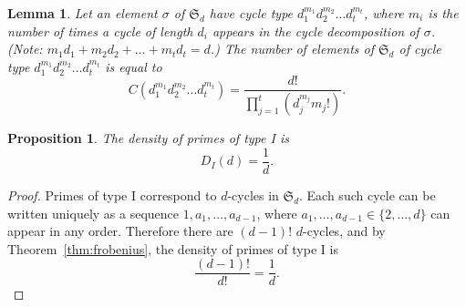 \documentclass[11pt]{article}
\theoremstyle{plain}
\newtheorem{lemma}[theorem]{Lemma}
\newtheorem{proposition}[theorem]{Proposition}
\theoremstyle{definition}
\theoremstyle{remark}
\numberwithin{equation}{section}
\renewcommand{\SS}{\mathfrak{S}}
\begin{document}
\begin{lemma}\label{lem:cycletype}
  Let an element $\sigma$ of $\SS_d$ have cycle type $d_1^{m_1}d_2^{m_2}\ldots d_t^{m_t}$, 
  where $m_i$ is the number of times a cycle of length $d_i$ appears in the cycle
  decomposition of $\sigma$. (Note: $m_1d_1+m_2d_2+\ldots +m_td_t=d$.) The number
   of elements of $\SS_d$ of cycle type $d_1^{m_1}d_2^{m_2}\ldots d_t^{m_t}$ is equal to
  \begin{equation*}
    C(d_1^{m_1}d_2^{m_2}\ldots d_t^{m_t})=\frac{d!}{\prod_{j=1}^t\left(d_j^{m_j}m_j!\right)}.
  \end{equation*}
\end{lemma}


\begin{proposition}\label{prop:type1}
  The density of primes of type I is 
  \begin{equation*}
    D_I(d)=\frac{1}{d}.
  \end{equation*}
\end{proposition}
\begin{proof}
  Primes of type I correspond to $d$-cycles in $\SS_d$.  Each such cycle can
  be written uniquely as a sequence $1,a_1,\ldots,a_{d-1}$, where
  $a_1,\ldots,a_{d-1}\in\{2,\ldots,d\}$ can appear in any order.  Therefore
  there are $(d-1)!$ $d$-cycles, and by Theorem~\ref{thm:frobenius},
  the density of primes of type I is
  \begin{equation*}
    \frac{(d-1)!}{d!}=\frac{1}{d}.
  \end{equation*}
\end{proof}
\end{document}
